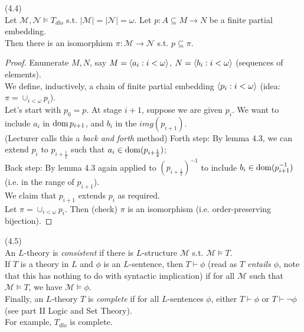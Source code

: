 \documentclass[a4paper]{article}
\begin{document}
\begin{thm} (4.4)\\
    Let $\mathcal{M},\mathcal{N} \vDash T_{dlo}$ s.t. $|\mathcal{M}| = |\mathcal{N}| = \omega$. Let $p:A \subseteq M \to N$ be a finite partial embedding.\\
    Then there is an isomorphism $\pi:\mathcal{M} \to \mathcal{N}$ s.t. $p \subseteq \pi$.
    \begin{proof}
        Enumerate $M,N$, say $M=\langle a_i:i < \omega\rangle$, $N=\langle b_i:i < \omega\rangle$ (sequences of elements).\\
        We define, inductively, a chain of finite partial embedding $\langle p_i:i<\omega\rangle$ (idea: $\pi = \cup_{i<\omega} p_i$).\\
        Let's start with $p_0 = p$. At stage $i+1$, suppose we are given $p_i$. We want to include $a_i$ in $\operatorname{dom} p_{i+1}$, and $b_i$ in the $img(p_{i+1})$.\\
        (Lecturer calls this a \emph{back and forth} method) Forth step: By lemma 4.3, we can extend $p_i$ to $p_{i+\frac{1}{2}}$ such that $a_i \in \operatorname{dom}(p_{i+\frac{1}{2}})$;\\
        Back step: By lemma 4.3 again applied to $(p_{i+\frac{1}{2}})^{-1}$ to include $b_i \in \operatorname{dom} (p_{i+1}^{-1})$ (i.e. in the range of $p_{i+1}$).\\
        We claim that $p_{i+1}$ extends $p_i$ as required.\\
        Let $\pi = \cup_{i < \omega} p_i$. Then (check) $\pi$ is an isomorphism (i.e. order-preserving bijection).
    \end{proof}
\end{thm}

\begin{defi} (4.5)\\
    An $L$-theory is \emph{consistent} if there is $L$-structure $\mathcal{M}$ s.t. $\mathcal{M} \vDash T$.\\
    If $T$ is a theory in $L$ and $\phi$ is an $L$-sentence, then $T \vdash \phi$ (read as \emph{$T$ entails $\phi$}, note that this has nothing to do with syntactic implication) if for all $\mathcal{M}$ such that $\mathcal{M} \vDash T$, we have $\mathcal{M} \vDash \phi$.\\
    Finally, an $L$-theory $T$ is \emph{complete} if for all $L$-sentences $\phi$, either $T \vdash \phi$ or $T \vdash \neg\phi$ (see part II Logic and Set Theory).\\
    For example, $T_{dlo}$ is complete.
\end{defi}
\end{document}
